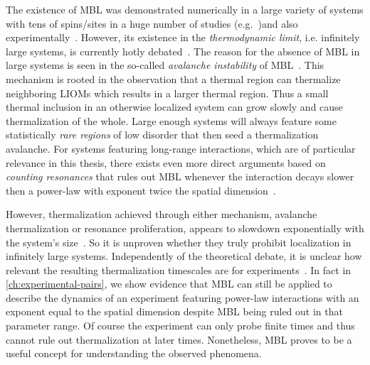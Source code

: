 The existence of MBL was demonstrated numerically in a large variety of systems with tens of spins/sites in a huge number of studies (e.g.~\cite{palManybodyLocalizationPhase2010,iyerManyBodyLocalizationQuasiperiodic2013,luitzManybodyLocalizationEdge2015,schifferManybodyLocalizationSpin2019,chandaManybodyLocalizationTransition2020})and also experimentally~\cite{schreiberObservationManybodyLocalization2015,choiObservationDiscreteTimecrystalline2017,lukinProbingEntanglementManybody2019,rispoliQuantumCriticalBehaviour2019}. However, its existence in the \emph{thermodynamic limit}, i.e. infinitely large systems, is currently hotly debated~\cite{abaninDistinguishingLocalizationChaos2021,morningstarAvalanchesManybodyResonances2022,haManyBodyResonancesAvalanche2023,scoccoThermalizationPropagationFront2024}. The reason for the absence of MBL in large systems is seen in the so-called \emph{avalanche instability} of MBL~\cite{ponteThermalInclusionsHow2017,thieryManyBodyDelocalizationQuantum2018,crowleyAvalancheInducedCoexisting2020,morningstarAvalanchesManybodyResonances2022}. This mechanism is rooted in the observation that a thermal region can thermalize neighboring LIOMs which results in a larger thermal region. Thus a small thermal inclusion in an otherwise localized system can grow slowly and cause thermalization of the whole. Large enough systems will always feature some statistically \emph{rare regions} of low disorder that then seed a thermalization avalanche.
For systems featuring long-range interactions, which are of particular relevance in this thesis, there exists even more direct arguments based on \emph{counting resonances} that rules out MBL whenever the interaction decays slower then a power-law with exponent twice the spatial dimension~\cite{burinEnergyDelocalizationStrongly2006,yaoManyBodyLocalizationDipolar2014,burinManybodyDelocalizationStrongly2015,burinLocalizationRandomXY2015}.

However, thermalization achieved through either mechanism, avalanche thermalization or resonance proliferation, appears to slowdown exponentially with the system's size~\cite{gopalakrishnanInstabilityManybodyLocalized2019,nandkishoreCriticalLocalizationVan2022,scoccoThermalizationPropagationFront2024}. So it is unproven whether they truly prohibit localization in infinitely large systems. Independently of the theoretical debate, it is unclear how relevant the resulting thermalization timescales are for experiments~\cite{longPhenomenologyPrethermalManyBody2023}. 
In fact in \autoref{ch:experimental-pairs}, we show evidence that MBL can still be applied to describe the dynamics of an experiment featuring power-law interactions with an exponent equal to the spatial dimension despite MBL being ruled out in that parameter range. Of course the experiment can only probe finite times and thus cannot rule out thermalization at later times. Nonetheless, MBL proves to be a useful concept for understanding the observed phenomena.

